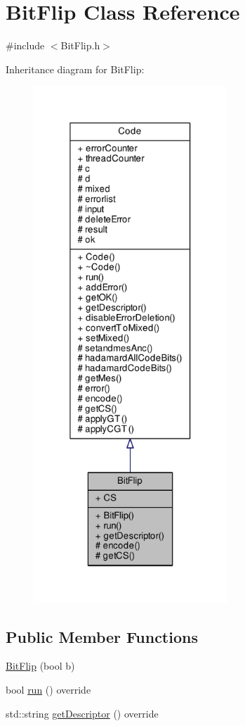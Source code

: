 \hypertarget{class_bit_flip}{}\section{Bit\+Flip Class Reference}
\label{class_bit_flip}


{\ttfamily \#include $<$Bit\+Flip.\+h$>$}



Inheritance diagram for Bit\+Flip\+:\nopagebreak
\begin{figure}[H]
\begin{center}
\leavevmode
\includegraphics[height=550pt]{class_bit_flip__inherit__graph}
\end{center}
\end{figure}
\subsection*{Public Member Functions}
\begin{DoxyCompactItemize}
\item 
\hyperlink{class_bit_flip_ae5135dd8438d0c1f1d2a9d19ed753e32}{Bit\+Flip} (bool b)
\item 
bool \hyperlink{class_bit_flip_a3022463e79c6624b2123617d1957d716}{run} () override
\item 
std\+::string \hyperlink{class_bit_flip_adc65379e4eeb6eb908318a98c304e16e}{get\+Descriptor} () override
\end{DoxyCompactItemize}
